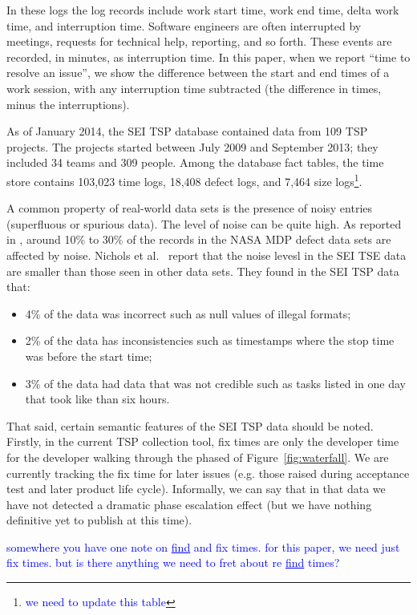 \documentclass{sig-alternate}
\newcommand{\bill}[1]{\textcolor{blue}{#1}}
\newcommand{\bi}{\begin{itemize}[leftmargin=0.4cm]}
\newcommand{\ei}{\end{itemize}}
\newcommand{\fig}[1]{Figure~\ref{fig:#1}}
\begin{document}
In these logs
the log records include work start time, work end time, delta
work time, and interruption time. Software engineers are often
interrupted by meetings, requests for technical help, reporting, and
so forth. These events are recorded, in minutes, as interruption
time. In this paper, when we report ``time to resolve an
issue'', we show the difference between the start and end times
of a work session, with any interruption time subtracted (the
difference in times, minus the interruptions).  

As of January 2014, the SEI TSP database contained data from 109
TSP projects. The projects started between July 2009 and
September 2013; they included 34 teams and 309 people. Among
the database fact tables, the time store contains 103,023 time logs,
18,408 defect logs, and 7,464 size logs\footnote{\bill{we need to 
update this table}}.  

A common property of real-world data sets is the presence
of noisy entries (superfluous  or spurious data). 
The level of noise can be quite high. As reported
in \cite{shepperd12}, around
10\% to 30\%
of the records in the NASA MDP defect data sets are
affected by noise. Nichols et al.~\cite{shirai14}  report that
the noise levesl in the SEI TSE data are smaller than those seen
in other data sets. They found in the SEI TSP data that:\bi 
\item
4\% of the data was incorrect such as  null values of illegal formats;
\item  2\% of the data has inconsistencies such as timestamps
where the stop time was before the start time;
\item 3\% of the data had data that was not credible
such as tasks listed in one day that took like than six hours.
\ei 
That said, certain semantic features of the SEI TSP data should be noted.
Firstly, in the current TSP collection tool, 
fix times are only the developer time for the developer walking through the phased of \fig{waterfall}.
We are currently tracking the fix time for later issues (e.g. those raised during  acceptance test and later
product life cycle). Informally, we can say that in that data we have not detected
a dramatic phase escalation effect (but we have nothing definitive yet to publish  at this time).

\bill{somewhere you have one note on \underline{find} and fix times.  for this paper, we need just fix times. but is there
anything we need to fret about re \underline{find} times?}
\end{document}
